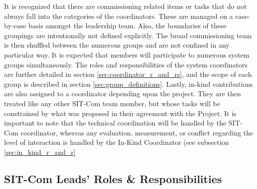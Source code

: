 \documentclass[SE,lsstdraft,authoryear,toc]{lsstdoc}
\begin{document}
It is recognized that there are commissioning related items or tasks that do not always fall into the categories of the coordinators.
These are managed on a case-by-case basis amongst the leadership team.
Also, the boundaries of these groupings are intentionally not defined explicitly.
The broad commissioning team is then shuffled between the numerous groups and are not confined in any particular way.
It is expected that members will participate to numerous system groups simultaneously.
The roles and responsibilities of the system coordinators are further detailed in section \ref{sec:coordinator_r_and_rs}, and the scope of each group is described in section \ref{sec:group_definitions}.
Lastly, in-kind contributions are also assigned to a coordinator depending upon the project.
They are then treated like any other SIT-Com team member, but whose tasks will be constrained by what was proposed in their agreement with the Project.
It is important to note that the technical coordination will be handled by the SIT-Com coordinator, whereas any evaluation, measurement, or conflict regarding the level of interaction is handled by the In-Kind Coordinator (see subsection \ref{sec:in_kind_r_and_r}

\subsection{SIT-Com Leads’ Roles \& Responsibilities}
\label{sec:r_and_rs}
\end{document}
